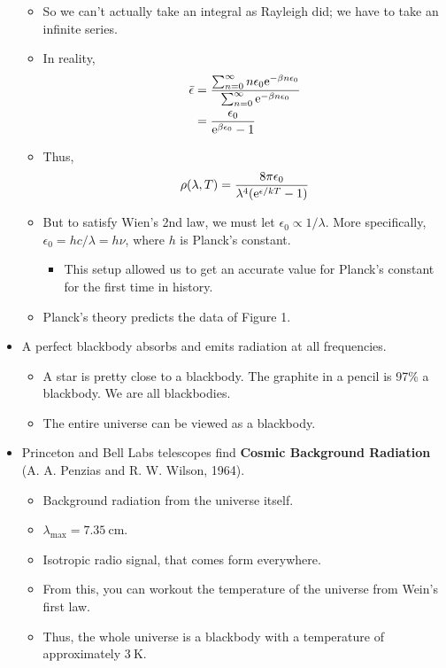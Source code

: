 \documentclass[../notes.tex]{subfiles}
\begin{document}
\begin{itemize}
\begin{itemize}
        \item So we can't actually take an integral as Rayleigh did; we have to take an infinite series.
        \item In reality,
        \begin{align*}
            \bar{\epsilon} &= \frac{\sum_{n=0}^\infty n\epsilon_0\e[-\beta n\epsilon_0]}{\sum_{n=0}^\infty\e[-\beta n\epsilon_0]}\\
            &= \frac{\epsilon_0}{\e[\beta\epsilon_0]-1}
        \end{align*}
        \item Thus,
        \begin{equation*}
            \rho(\lambda,T) = \frac{8\pi\epsilon_0}{\lambda^4(\e[\epsilon/kT]-1)}
        \end{equation*}
        \item But to satisfy Wien's 2nd law, we must let $\epsilon_0\propto 1/\lambda$. More specifically, $\epsilon_0=hc/\lambda=h\nu$, where $h$ is Planck's constant.
        \begin{itemize}
            \item This setup allowed us to get an accurate value for Planck's constant for the first time in history.
        \end{itemize}
        \item Planck's theory predicts the data of Figure 1.
    \end{itemize}
    \item A perfect blackbody absorbs and emits radiation at all frequencies.
    \begin{itemize}
        \item A star is pretty close to a blackbody. The graphite in a pencil is 97\% a blackbody. We are all blackbodies.
        \item The entire universe can be viewed as a blackbody.
    \end{itemize}
    \item Princeton and Bell Labs telescopes find \textbf{Cosmic Background Radiation} (A. A. Penzias and R. W. Wilson, 1964).
    \begin{itemize}
        \item Background radiation from the universe itself.
        \item $\lambda_\text{max}=\SI{7.35}{\centi\meter}$.
        \item Isotropic radio signal, that comes form everywhere.
        \item From this, you can workout the temperature of the universe from Wein's first law.
        \item Thus, the whole universe is a blackbody with a temperature of approximately $\SI{3}{\kelvin}$.
    \end{itemize}
\end{itemize}
\end{document}
